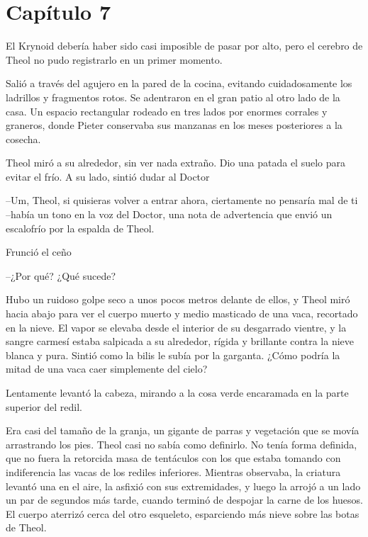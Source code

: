 \chapter*{Capítulo 7}

El Krynoid debería haber sido casi imposible de pasar por alto, pero el cerebro de Theol no pudo registrarlo en un primer momento.



Salió a través del agujero en la pared de la cocina, evitando cuidadosamente los ladrillos y fragmentos rotos. Se adentraron en el gran patio al otro lado de la casa. Un espacio rectangular rodeado en tres lados por enormes corrales y graneros, donde Pieter conservaba sus manzanas en los meses posteriores a la cosecha.



Theol miró a su alrededor, sin ver nada extraño. Dio una patada el suelo para evitar el frío. A su lado, sintió dudar al Doctor 

--Um, Theol, si quisieras volver a entrar ahora, ciertamente no pensaría mal de ti --había un tono en la voz del Doctor, una nota de advertencia que envió un escalofrío por la espalda de Theol.



Frunció el ceño 

--¿Por qué? ¿Qué sucede?



Hubo un ruidoso golpe seco a unos pocos metros delante de ellos, y Theol miró hacia abajo para ver el cuerpo muerto y medio masticado de una vaca, recortado en la nieve. El vapor se elevaba desde el interior de su desgarrado vientre, y la sangre carmesí estaba salpicada a su alrededor, rígida y brillante contra la nieve blanca y pura. Sintió como la bilis le subía por la garganta. ¿Cómo podría la mitad de una vaca caer simplemente del cielo?



Lentamente levantó la cabeza, mirando a la cosa verde encaramada en la parte superior del redil.



Era casi del tamaño de la granja, un gigante de parras y vegetación que se movía arrastrando los pies. Theol casi no sabía como definirlo. No tenía forma definida, que no fuera la retorcida masa de tentáculos con los que estaba tomando con indiferencia las vacas de los rediles inferiores. Mientras observaba, la criatura levantó una en el aire, la asfixió con sus extremidades, y luego la arrojó a un lado un par de segundos más tarde, cuando terminó de despojar la carne de los huesos. El cuerpo aterrizó cerca del otro esqueleto, esparciendo más nieve sobre las botas de Theol.



